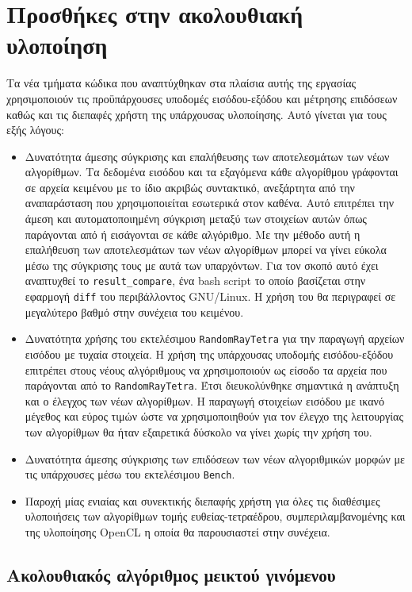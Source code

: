 \section{Προσθήκες στην ακολουθιακή υλοποίηση}

\noindent Τα νέα τμήματα κώδικα που αναπτύχθηκαν στα πλαίσια αυτής της εργασίας χρησιμοποιούν τις προϋπάρχουσες υποδομές εισόδου-εξόδου και μέτρησης επιδόσεων καθώς και τις διεπαφές χρήστη της υπάρχουσας υλοποίησης. Αυτό γίνεται για τους εξής λόγους:

\begin{itemize}
\item Δυνατότητα άμεσης σύγκρισης και επαλήθευσης των αποτελεσμάτων των νέων αλγορίθμων. Τα δεδομένα εισόδου και τα εξαγόμενα κάθε αλγορίθμου γράφονται σε αρχεία κειμένου με το ίδιο ακριβώς συντακτικό, ανεξάρτητα από την αναπαράσταση που χρησιμοποιείται εσωτερικά στον καθένα. Αυτό επιτρέπει την άμεση και αυτοματοποιημένη σύγκριση μεταξύ των στοιχείων αυτών όπως παράγονται από ή εισάγονται σε κάθε αλγόριθμο. Με την μέθοδο αυτή η επαλήθευση των αποτελεσμάτων των νέων αλγορίθμων μπορεί να γίνει εύκολα μέσω της σύγκρισης τους με αυτά των υπαρχόντων. Για τον σκοπό αυτό έχει αναπτυχθεί το \verb!result_compare!, ένα bash script το οποίο βασίζεται στην εφαρμογή \verb!diff! του περιβάλλοντος GNU/Linux. Η χρήση του θα περιγραφεί σε μεγαλύτερο βαθμό στην συνέχεια του κειμένου. 
\item Δυνατότητα χρήσης του εκτελέσιμου \verb!RandomRayTetra! για την παραγωγή αρχείων εισόδου με τυχαία στοιχεία. Η χρήση της υπάρχουσας υποδομής εισόδου-εξόδου επιτρέπει στους νέους αλγόριθμους να χρησιμοποιούν ως είσοδο τα αρχεία που παράγονται από το \verb!RandomRayTetra!. Έτσι διευκολύνθηκε σημαντικά η ανάπτυξη και ο έλεγχος των νέων αλγορίθμων. Η παραγωγή στοιχείων εισόδου με ικανό μέγεθος και εύρος τιμών ώστε να χρησιμοποιηθούν για τον έλεγχο της λειτουργίας των αλγορίθμων θα ήταν εξαιρετικά δύσκολο να γίνει χωρίς την χρήση του.
\item Δυνατότητα άμεσης σύγκρισης των επιδόσεων των νέων αλγοριθμικών μορφών με τις υπάρχουσες μέσω του εκτελέσιμου \verb!Bench!.
\item Παροχή μίας ενιαίας και συνεκτικής διεπαφής χρήστη για όλες τις διαθέσιμες υλοποιήσεις των αλγορίθμων τομής ευθείας-τετραέδρου, συμπεριλαμβανομένης και της υλοποίησης OpenCL η οποία θα παρουσιαστεί στην συνέχεια.
\end{itemize}


\subsection{Ακολουθιακός αλγόριθμος μεικτού γινόμενου}


